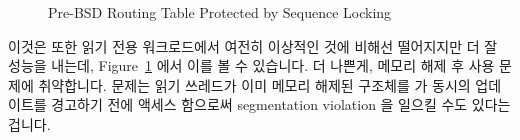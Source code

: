\begin{figure}[tb]
\centering
{}
\caption{Pre-BSD Routing Table Protected by Sequence Locking}
\label{fig:defer:Pre-BSD Routing Table Protected by Sequence Locking}
\end{figure}

이것은 또한 읽기 전용 워크로드에서 여전히 이상적인 것에 비해선 떨어지지만 더 잘
성능을 내는데,
Figure~\ref{fig:defer:Pre-BSD Routing Table Protected by Sequence Locking} 에서
이를 볼 수 있습니다.
더 나쁜게, 메모리 해제 후 사용 문제에 취약합니다.
문제는 읽기 쓰레드가 이미 메모리 해제된 구조체를  가 동시의
업데이트를 경고하기 전에 액세스 함으로써 segmentation violation 을 일으킬 수도
있다는 겁니다.


